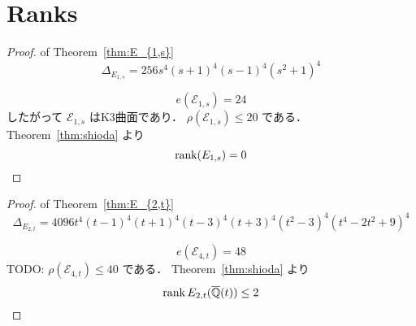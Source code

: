\documentclass[main]{subfiles}
\begin{document}
\chapter{Ranks}

\begin{proof}{of Theorem~\ref{thm:E_{1,s}}}
    \begin{equation}
        \Delta_{E_{1,s}} = 256s^{4} (s + 1)^{4} (s - 1)^{4} (s^{2} + 1)^{4}
    \end{equation}
    
    \begin{equation}
        e(\mathcal{E}_{1,s}) = 24
    \end{equation}
    したがって $\mathcal{E}_{1,s}$ はK3曲面であり． $\rho(\mathcal{E}_{1,s}) \leq 20$ である．
    Theorem~\ref{thm:shioda} より
    \begin{equation}
        \operatorname{rank}(E_{1,s}) = 0
    \end{equation}
\end{proof}

\begin{proof}{of Theorem~\ref{thm:E_{2,t}}}
    \begin{equation}
        \Delta_{E_{2,t}} = 4096t^{4}(t - 1)^{4}(t + 1)^{4}(t - 3)^{4}(t + 3)^{4}(t^{2} - 3)^{4}(t^{4} - 2t^{2} + 9)^{4}
    \end{equation}
    
    \begin{equation}
        e(\mathcal{E}_{4,t}) = 48
    \end{equation}
    TODO: $\rho(\mathcal{E}_{4,t}) \leq 40$ である．
    Theorem~\ref{thm:shioda} より
    \begin{equation}
        \operatorname{rank} E_{2,t}(\overline{\mathbb{Q}}(t)) \leq 2
    \end{equation}
\end{proof}
\end{document}
